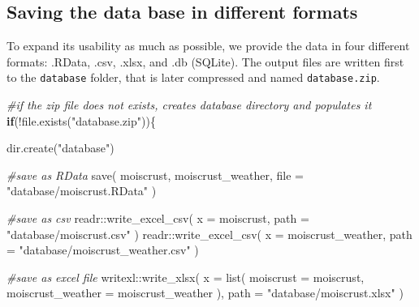 \documentclass[
  table]{article}
\newenvironment{Shaded}{\begin{snugshade}}{\end{snugshade}}
\newcommand{\AttributeTok}[1]{\textcolor[rgb]{0.77,0.63,0.00}{#1}}
\newcommand{\CommentTok}[1]{\textcolor[rgb]{0.56,0.35,0.01}{\textit{#1}}}
\newcommand{\ControlFlowTok}[1]{\textcolor[rgb]{0.13,0.29,0.53}{\textbf{#1}}}
\newcommand{\FunctionTok}[1]{\textcolor[rgb]{0.00,0.00,0.00}{#1}}
\newcommand{\NormalTok}[1]{#1}
\newcommand{\SpecialCharTok}[1]{\textcolor[rgb]{0.00,0.00,0.00}{#1}}
\newcommand{\StringTok}[1]{\textcolor[rgb]{0.31,0.60,0.02}{#1}}
\begin{document}
\hypertarget{saving-the-data-base-in-different-formats}{%
\subsection{Saving the data base in different
formats}\label{saving-the-data-base-in-different-formats}}

To expand its usability as much as possible, we provide the data in four
different formats: .RData, .csv, .xlsx, and .db (SQLite). The output
files are written first to the \texttt{database} folder, that is later
compressed and named \texttt{database.zip}.

\begin{Shaded}
\begin{Highlighting}[]
\CommentTok{\#if the zip file does not exists, creates database directory and populates it}
\ControlFlowTok{if}\NormalTok{(}\SpecialCharTok{!}\FunctionTok{file.exists}\NormalTok{(}\StringTok{"database.zip"}\NormalTok{))\{}
  
  \FunctionTok{dir.create}\NormalTok{(}\StringTok{"database"}\NormalTok{)}
  
  \CommentTok{\#save as RData}
  \FunctionTok{save}\NormalTok{(}
\NormalTok{    moiscrust, }
\NormalTok{    moiscrust\_weather,}
    \AttributeTok{file =} \StringTok{"database/moiscrust.RData"}
\NormalTok{  )}
  
  \CommentTok{\#save as csv}
\NormalTok{  readr}\SpecialCharTok{::}\FunctionTok{write\_excel\_csv}\NormalTok{(}
    \AttributeTok{x =}\NormalTok{ moiscrust,}
    \AttributeTok{path =} \StringTok{"database/moiscrust.csv"}
\NormalTok{  )}
\NormalTok{  readr}\SpecialCharTok{::}\FunctionTok{write\_excel\_csv}\NormalTok{(}
    \AttributeTok{x =}\NormalTok{ moiscrust\_weather,}
    \AttributeTok{path =} \StringTok{"database/moiscrust\_weather.csv"}
\NormalTok{  )}
  
  \CommentTok{\#save as excel file}
\NormalTok{  writexl}\SpecialCharTok{::}\FunctionTok{write\_xlsx}\NormalTok{(}
    \AttributeTok{x =} \FunctionTok{list}\NormalTok{(}
      \AttributeTok{moiscrust =}\NormalTok{ moiscrust,}
      \AttributeTok{moiscrust\_weather =}\NormalTok{ moiscrust\_weather}
\NormalTok{      ),}
    \AttributeTok{path =} \StringTok{"database/moiscrust.xlsx"}
\NormalTok{  )}
  

\end{Highlighting}
\end{Shaded}
\end{document}
